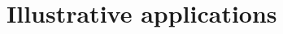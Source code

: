 \documentclass[12pt]{article}
\begin{document}


\section{Illustrative applications}
\end{document}
